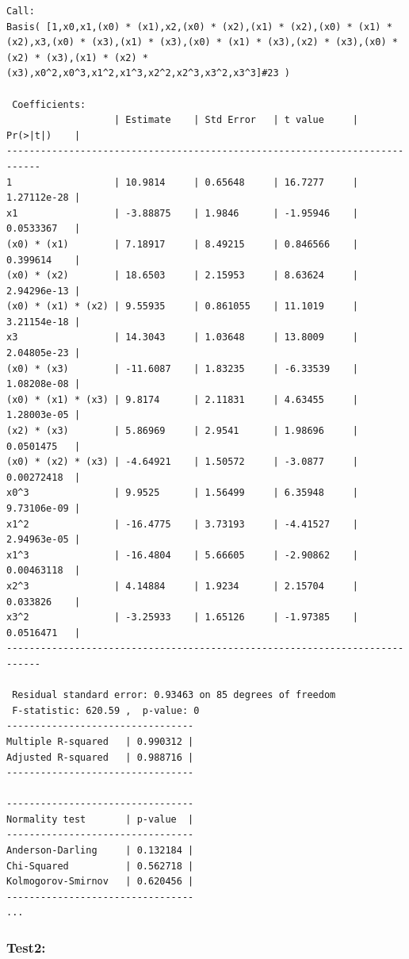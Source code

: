 \begin{lstlisting}[style=output,basicstyle=\tiny]
 Call:
Basis( [1,x0,x1,(x0) * (x1),x2,(x0) * (x2),(x1) * (x2),(x0) * (x1) * (x2),x3,(x0) * (x3),(x1) * (x3),(x0) * (x1) * (x3),(x2) * (x3),(x0) * (x2) * (x3),(x1) * (x2) * (x3),x0^2,x0^3,x1^2,x1^3,x2^2,x2^3,x3^2,x3^3]#23 )

 Coefficients:
                   | Estimate    | Std Error   | t value     | Pr(>|t|)    | 
----------------------------------------------------------------------------
1                  | 10.9814     | 0.65648     | 16.7277     | 1.27112e-28 | 
x1                 | -3.88875    | 1.9846      | -1.95946    | 0.0533367   | 
(x0) * (x1)        | 7.18917     | 8.49215     | 0.846566    | 0.399614    | 
(x0) * (x2)        | 18.6503     | 2.15953     | 8.63624     | 2.94296e-13 | 
(x0) * (x1) * (x2) | 9.55935     | 0.861055    | 11.1019     | 3.21154e-18 | 
x3                 | 14.3043     | 1.03648     | 13.8009     | 2.04805e-23 | 
(x0) * (x3)        | -11.6087    | 1.83235     | -6.33539    | 1.08208e-08 | 
(x0) * (x1) * (x3) | 9.8174      | 2.11831     | 4.63455     | 1.28003e-05 | 
(x2) * (x3)        | 5.86969     | 2.9541      | 1.98696     | 0.0501475   | 
(x0) * (x2) * (x3) | -4.64921    | 1.50572     | -3.0877     | 0.00272418  | 
x0^3               | 9.9525      | 1.56499     | 6.35948     | 9.73106e-09 | 
x1^2               | -16.4775    | 3.73193     | -4.41527    | 2.94963e-05 | 
x1^3               | -16.4804    | 5.66605     | -2.90862    | 0.00463118  | 
x2^3               | 4.14884     | 1.9234      | 2.15704     | 0.033826    | 
x3^2               | -3.25933    | 1.65126     | -1.97385    | 0.0516471   | 
----------------------------------------------------------------------------

 Residual standard error: 0.93463 on 85 degrees of freedom 
 F-statistic: 620.59 ,  p-value: 0
---------------------------------
Multiple R-squared   | 0.990312 | 
Adjusted R-squared   | 0.988716 | 
---------------------------------

---------------------------------
Normality test       | p-value  | 
---------------------------------
Anderson-Darling     | 0.132184 | 
Chi-Squared          | 0.562718 | 
Kolmogorov-Smirnov   | 0.620456 | 
---------------------------------
...
\end{lstlisting}

\newpage
\subsubsection{Test2:}

